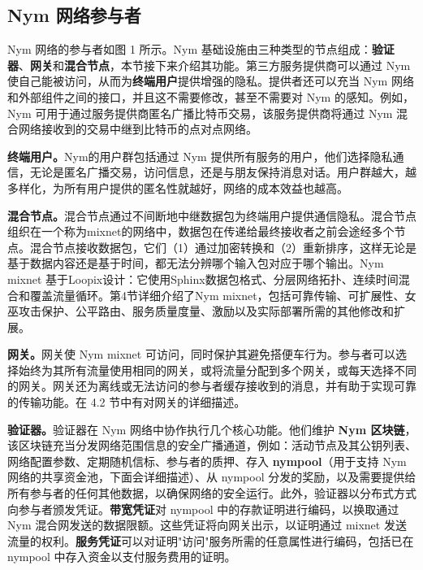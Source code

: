 \documentclass{article}
\begin{document}
	\subsection{Nym 网络参与者}
	
	Nym 网络的参与者如图 1 所示。Nym 基础设施由三种类型的节点组成：\textbf{验证器}、\textbf{网关}和\textbf{混合节点}，本节接下来介绍其功能。第三方服务提供商可以通过 Nym 使自己能被访问，从而为\textbf{终端用户}提供增强的隐私。提供者还可以充当 Nym 网络和外部组件之间的接口，并且这不需要修改，甚至不需要对 Nym 的感知。例如，Nym 可用于通过服务提供商匿名广播比特币交易，该服务提供商将通过 Nym 混合网络接收到的交易中继到比特币的点对点网络。\newline

	\textbf{终端用户。}Nym的用户群包括通过 Nym 提供所有服务的用户，他们选择隐私通信，无论是匿名广播交易，访问信息，还是与朋友保持消息对话。用户群越大，越多样化，为所有用户提供的匿名性就越好，网络的成本效益也越高。\newline

	\textbf{混合节点。}混合节点通过不间断地中继数据包为终端用户提供通信隐私。混合节点组织在一个称为mixnet的网络中，数据包在传递给最终接收者之前会途经多个节点。混合节点接收数据包，它们（1）通过加密转换和（2）重新排序，这样无论是基于数据内容还是基于时间，都无法分辨哪个输入包对应于哪个输出。Nym mixnet 基于Loopix设计\cite{ref89}：它使用Sphinx数据包格式\cite{ref29}、分层网络拓扑\cite{ref36}、连续时间混合\cite{ref66}和覆盖流量循环\cite{ref30}。第4节详细介绍了Nym mixnet，包括可靠传输、可扩展性、女巫攻击保护、公平路由、服务质量度量、激励以及实际部署所需的其他修改和扩展。\newline

	\textbf{网关。}网关使 Nym mixnet 可访问，同时保护其避免搭便车行为。参与者可以选择始终为其所有流量使用相同的网关，或将流量分配到多个网关，或每天选择不同的网关。网关还为离线或无法访问的参与者缓存接收到的消息，并有助于实现可靠的传输功能。在 4.2 节中有对网关的详细描述。\newline

	\textbf{验证器。}验证器在 Nym 网络中协作执行几个核心功能。他们维护 \textbf{Nym 区块链}，该区块链充当分发网络范围信息的安全广播通道，例如：活动节点及其公钥列表、网络配置参数、定期随机信标、参与者的质押、存入 \textbf{nympool}（用于支持 Nym 网络的共享资金池，下面会详细描述）、从 nympool 分发的奖励，以及需要提供给所有参与者的任何其他数据，以确保网络的安全运行。此外，验证器以分布式方式向参与者颁发凭证。\textbf{带宽凭证}对 nympool 中的存款证明进行编码，以换取通过 Nym 混合网发送的数据限额。这些凭证将向网关出示，以证明通过 mixnet 发送流量的权利。\textbf{服务凭证}可以对证明"访问"服务所需的任意属性进行编码，包括已在 nympool 中存入资金以支付服务费用的证明。\newline
\end{document}
